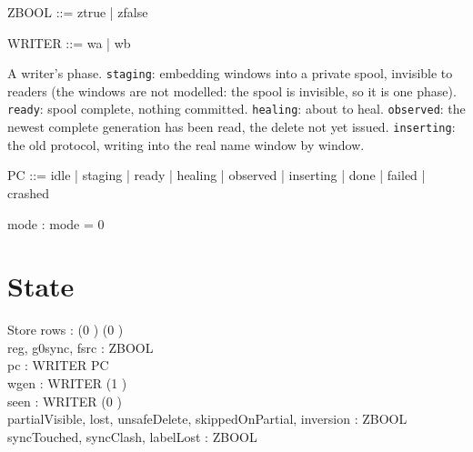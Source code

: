 \documentclass[a4paper,10pt,fleqn]{article}
\newcommand{\field}[1]{\texttt{#1}}
\begin{document}
\begin{zed}
ZBOOL ::= ztrue | zfalse
\end{zed}

\begin{zed}
WRITER ::= wa | wb
\end{zed}

A writer's phase. \field{staging}: embedding windows into a private spool,
invisible to readers (the windows are not modelled: the spool is invisible, so
it is one phase). \field{ready}: spool complete, nothing committed.
\field{healing}: about to heal. \field{observed}: the newest complete generation
has been read, the delete not yet issued. \field{inserting}: the old protocol,
writing into the real name window by window.

\begin{zed}
PC ::= idle | staging | ready | healing | observed | inserting
     | done | failed | crashed
\end{zed}

\begin{axdef}
mode : \nat
\where
mode = 0
\end{axdef}

\section{State}
\label{sec:state}

\begin{schema}{Store}
rows : (0 ) \fun (0 ) \\
reg, g0sync, fsrc : ZBOOL \\
pc : WRITER \fun PC \\
wgen : WRITER \fun (1 ) \\
seen : WRITER \fun (0 ) \\
partialVisible, lost, unsafeDelete, skippedOnPartial, inversion : ZBOOL \\
syncTouched, syncClash, labelLost : ZBOOL
\end{schema}
\end{document}
